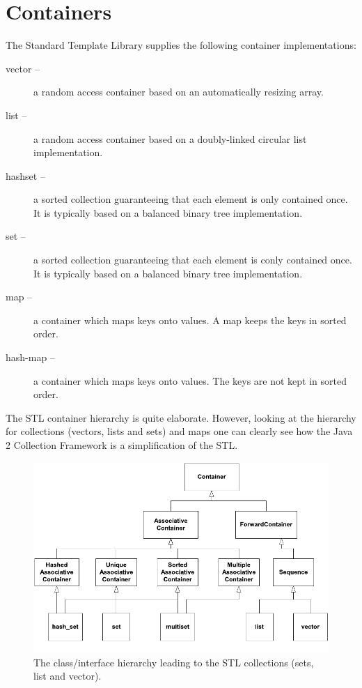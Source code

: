 \section{Containers}

The Standard Template Library supplies the following container 
implementations:
\begin{description}
  \item[vector -- ] a random access container based on an automatically
                    resizing array.
  \item[list -- ] a random access container based on a doubly-linked
                  circular list implementation.                    
  \item[hashset -- ] a sorted collection guaranteeing that each element is
                 only contained once. It is typically based on a balanced
                 binary tree implementation.
  \item[set -- ] a sorted collection guaranteeing that each element is 
                 conly contained once. It is typically based on a balanced 
                 binary tree implementation.
  \item[map -- ] a container which maps keys onto values. A map keeps the
                 keys in sorted order.
  \item[hash-map -- ] a container which maps keys onto values. The
                 keys are not kept in sorted order.
\end{description}

The STL container hierarchy is quite elaborate. However, looking at
the hierarchy for collections (vectors, lists and sets) and maps one
can clearly see how the Java 2 Collection Framework is a simplification
of the STL.

  \begin{figure}[htb]
    \begin{center}  
      \includegraphics{STL/Containers.pdf}
    \end{center}  
    \caption{The class/interface hierarchy leading to the STL collections
             (sets, list and vector).
             \label{figContainers}} 
  \end{figure}

